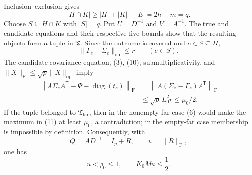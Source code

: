 Inclusion--exclusion gives
\[
|H\cap K|\geq|H|+|K|-|E|=2h-m=q.
\]
Choose \(S\subseteq H\cap K\) with \(|S|=q\). Put \(U=D^{-1}\) and \(V=A^{-1}\). The true and candidate equations and their respective five bounds show that the resulting objects form a tuple in \(\mathfrak T\). Since the outcome is covered and \(e\in S\subseteq H\),
\[
\|\Gamma_e-\Sigma_e\|_{\mathrm{op}}\leq r
\qquad(e\in S).
\tag{10}
\]
The candidate covariance equation, (3), (10), submultiplicativity, and \(\|X\|_{\mathrm F}\leq\sqrt p\|X\|_{\mathrm{op}}\) imply
\[
\begin{aligned}
\left\|A\Sigma_eA^{\mathsf T}
-\Psi-\operatorname{diag}(t_e)\right\|_{\mathrm F}
&=\left\|A(\Sigma_e-\Gamma_e)A^{\mathsf T}\right\|_{\mathrm F}\\
&\leq\sqrt p\,L_0^2r
\leq\mu_0/2.
\end{aligned}
\tag{11}
\]
If the tuple belonged to \(\mathfrak T_{\mathrm{far}}\), then in the nonempty-far case (6) would make the maximum in (11) at least \(\mu_0\), a contradiction; in the empty-far case membership is impossible by definition. Consequently, with
\[
Q=AD^{-1}=I_p+R,
\qquad u=\|R\|_{\mathrm F},
\]
one has
\[
u<\rho_0\leq1,
\qquad K_0\overline M u\leq\frac12.
\tag{12}
\]

